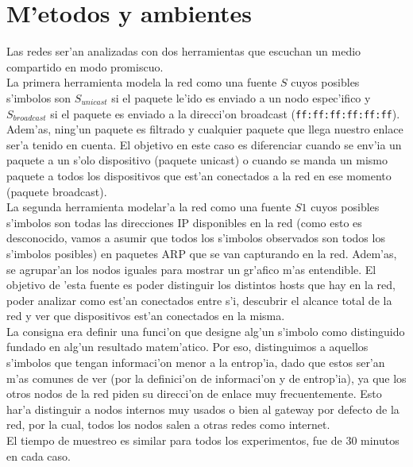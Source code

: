 \section{M'etodos y ambientes}
Las redes ser'an analizadas con dos herramientas que escuchan un medio compartido en modo promiscuo. \\

La primera herramienta
 modela la red como una fuente $S$ cuyos posibles s'imbolos son $S_{unicast}$ si el paquete le'ido es enviado
 a un nodo espec'ifico y $S_{broadcast}$ si el paquete es enviado a la direcci'on broadcast (\texttt{ff:ff:ff:ff:ff:ff}). 
 Adem'as, ning'un paquete es filtrado y cualquier paquete que llega nuestro enlace ser'a tenido en cuenta.
 El objetivo en este caso es diferenciar cuando se env'ia un paquete a un s'olo dispositivo (paquete unicast) o cuando se manda
 un mismo paquete a todos los dispositivos que est'an conectados a la red en ese momento (paquete broadcast).\\
 
La segunda herramienta modelar'a la red como una fuente $S1$ cuyos posibles s'imbolos son todas las direcciones IP disponibles
en la red (como esto es desconocido, vamos a asumir que todos los s'imbolos observados son todos los s'imbolos posibles) en 
paquetes ARP que se van capturando en la red. Adem'as, se agrupar'an los nodos iguales para mostrar un gr'afico m'as entendible. 
El objetivo de 'esta fuente es poder distinguir los distintos hosts que hay en la red, poder analizar como est'an conectados entre s'i, 
 descubrir el alcance total de la red y ver que dispositivos est'an conectados en la misma.\\ 

La consigna era definir una funci'on que designe alg'un s'imbolo como distinguido
fundado en alg'un resultado matem'atico. Por eso, distinguimos a aquellos s'imbolos que tengan informaci'on menor a
la entrop'ia, dado que estos ser'an m'as comunes de ver (por la definici'on de informaci'on y de entrop'ia), ya que los otros
nodos de la red piden su direcci'on de enlace muy frecuentemente. Esto har'a distinguir a nodos internos muy usados o bien
al gateway por defecto de la red, por la cual, todos los nodos salen a otras redes como internet.\\

El tiempo de muestreo es similar para todos los experimentos, fue de 30 minutos en cada caso. \\

